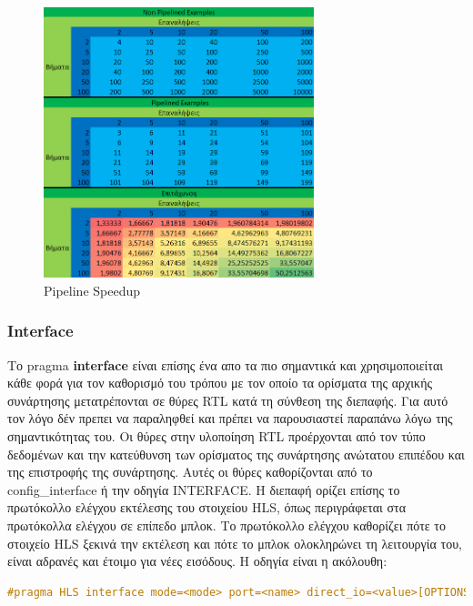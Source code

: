 \begin{figure}[h!]
  \centering
  \includegraphics[width=0.7\textwidth]{figures/chapter3/pipelined_speedup.png}
  \caption{Pipeline Speedup}
    \label{fig:pipelined_speedup}
\end{figure}

\subsubsection{Interface}
Το pragma \textbf{interface} είναι επίσης ένα απο τα πιο σημαντικά και χρησιμοποιείται κάθε φορά για τον καθορισμό του τρόπου με τον οποίο τα ορίσματα της αρχικής συνάρτησης
μετατρέπονται σε θύρες RTL κατά τη σύνθεση της διεπαφής. Για αυτό τον λόγο δέν πρεπει να παραληφθεί και πρέπει να παρουσιαστεί παραπάνω λόγω της σημαντικότητας του.
Οι θύρες στην υλοποίηση RTL προέρχονται από τον τύπο δεδομένων και την κατεύθυνση των ορίσματος της συνάρτησης ανώτατου επιπέδου και της επιστροφής της συνάρτησης.
Αυτές οι θύρες καθορίζονται από το config\_interface ή την οδηγία INTERFACE. Η διεπαφή ορίζει επίσης το πρωτόκολλο ελέγχου εκτέλεσης του στοιχείου HLS,
όπως περιγράφεται στα πρωτόκολλα ελέγχου σε επίπεδο μπλοκ. Το πρωτόκολλο ελέγχου καθορίζει πότε το στοιχείο HLS ξεκινά την εκτέλεση και πότε το μπλοκ ολοκληρώνει
τη λειτουργία του, είναι αδρανές και έτοιμο για νέες εισόδους. Η οδηγία είναι η ακόλουθη:

\begin{lstlisting}[language=C++, caption={Οδηγία Interface}]
  #pragma HLS interface mode=<mode> port=<name> direct_io=<value>[OPTIONS]
\end{lstlisting}

